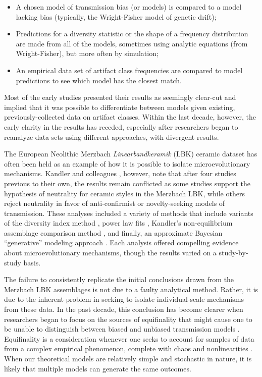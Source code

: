 \begin{itemize}
    \item A chosen model of transmission bias (or models) is compared to a model lacking bias (typically, the Wright-Fisher model of genetic drift);
    \item Predictions for a diversity statistic or the shape of a frequency distribution are made from all of the models, sometimes using analytic equations (from Wright-Fisher), but more often by simulation;
    \item An empirical data set of artifact class frequencies are compared to model predictions to see which model has the closest match.
\end{itemize}

Most of the early studies presented their results as seemingly clear-cut and implied that it was possible to differentiate between models given existing, previously-collected data on artifact classes.  Within the last decade, however, the early clarity in the results has receded, especially after researchers began to reanalyze data sets using different approaches, with divergent results.

The European Neolithic Merzbach \emph{Linearbandkeramik} (LBK) ceramic dataset has often been held as an example of how it is possible to isolate microevolutionary mechanisms. Kandler and colleagues \citeyearpar{Kandler20150905}, however, note that after four studies previous to their own, the results remain conflicted as some studies support the hypothesis of neutrality for ceramic styles in the Merzbach LBK, while others reject neutrality in favor of anti-confirmist or novelty-seeking models of transmission.  These analyses included a variety of methods that include variants of the diversity index method \citep{Shennan2001,shennan2008style}, power law fits \citep{Bentley2003,shennan2008style}, Kandler's non-equilibrium assemblage comparison method \citep{Kandler2013}, and finally, an approximate Bayesian ``generative'' modeling approach \citep{Kandler20150905}.  Each analysis offered compelling evidence about microevolutionary mechanisms, though the results varied on a study-by-study basis.  

The failure to consistently replicate the initial conclusions drawn from the Merzbach LBK assemblages is not due to a faulty analytical method.  Rather, it is due to the inherent problem in seeking to isolate individual-scale mechanisms from these data.  In the past decade, this conclusion has become clearer when researchers began to focus on the sources of equifinality that might cause one to be unable to distinguish between biased and unbiased transmission models \citep{premo2010equifinality}.  Equifinality is a consideration whenever one seeks to account for samples of data from a complex empirical phenomenon, complete with chaos and nonlinearities \citep{bertalanffy1969general}.  When our theoretical models are relatively simple and stochastic in nature, it is likely that multiple models can generate the same outcomes.  

